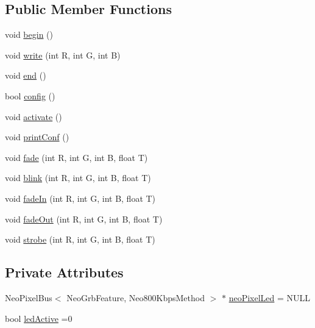 \subsection*{Public Member Functions}
\begin{DoxyCompactItemize}
\item 
void \hyperlink{class_cool_board_led_ae3cbde8affcc6f011cbd698c8ef911f6}{begin} ()
\item 
void \hyperlink{class_cool_board_led_a30fadd4cbec17ceea428bf7a32207e87}{write} (int R, int G, int B)
\item 
void \hyperlink{class_cool_board_led_a69f323359e0c9f797422f2152b5d41ef}{end} ()
\item 
bool \hyperlink{class_cool_board_led_a1b60e5e30bea96c49ed62ed1bf1ffc8b}{config} ()
\item 
void \hyperlink{class_cool_board_led_ae74fe4b47d06c3a97b468ba220c4eb99}{activate} ()
\item 
void \hyperlink{class_cool_board_led_a8ed3053a36f0ed4a131f43b5b17efb61}{print\+Conf} ()
\item 
void \hyperlink{class_cool_board_led_af1cacbaa88db8bcf6042c1083ba41155}{fade} (int R, int G, int B, float T)
\item 
void \hyperlink{class_cool_board_led_a96e1ea13003eee34c9dbcef340404426}{blink} (int R, int G, int B, float T)
\item 
void \hyperlink{class_cool_board_led_ab778f5e7bed0ab74e3906d82110493c3}{fade\+In} (int R, int G, int B, float T)
\item 
void \hyperlink{class_cool_board_led_a93d545679237e8cc858324367149775c}{fade\+Out} (int R, int G, int B, float T)
\item 
void \hyperlink{class_cool_board_led_ad5f0de4c628cbfbf49896042831c64ad}{strobe} (int R, int G, int B, float T)
\end{DoxyCompactItemize}
\subsection*{Private Attributes}
\begin{DoxyCompactItemize}
\item 
Neo\+Pixel\+Bus$<$ Neo\+Grb\+Feature, Neo800\+Kbps\+Method $>$ $\ast$ \hyperlink{class_cool_board_led_ac2c13fa462a010cd9242bf297c013923}{neo\+Pixel\+Led} = N\+U\+LL
\item 
bool \hyperlink{class_cool_board_led_aadd04d2ecf123247718d77f42fba7f08}{led\+Active} =0
\end{DoxyCompactItemize}


